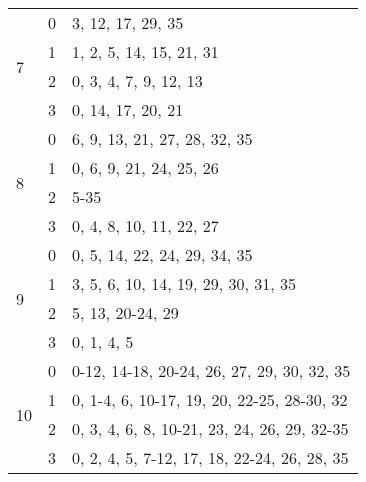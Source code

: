 \begin{table}[htb!]
\begin{tabular}{@{} lll @{}}
    \multirow{4}{*}{7} & 0 & 3, 12, 17, 29, 35\\
    & 1 & 1, 2, 5, 14, 15, 21, 31\\
    & 2 & 0, 3, 4, 7, 9, 12, 13\\
    & 3 & 0, 14, 17, 20, 21\\
    \multirow{4}{*}{8} & 0 & 6, 9, 13, 21, 27, 28, 32, 35\\
    & 1 & 0, 6, 9, 21, 24, 25, 26\\
    & 2 & 5-35\\
    & 3 & 0, 4, 8, 10, 11, 22, 27\\
    \multirow{4}{*}{9} & 0 & 0, 5, 14, 22, 24, 29, 34, 35\\
    & 1 & 3, 5, 6, 10, 14, 19, 29, 30, 31, 35\\
    & 2 & 5, 13, 20-24, 29\\
    & 3 & 0, 1, 4, 5\\
    \multirow{4}{*}{10} & 0 & 0-12, 14-18, 20-24, 26, 27, 29, 30, 32, 35\\
    & 1 & 0, 1-4, 6, 10-17, 19, 20, 22-25, 28-30, 32\\
    & 2 & 0, 3, 4, 6, 8, 10-21, 23, 24, 26, 29, 32-35\\
    & 3 & 0, 2, 4, 5, 7-12, 17, 18, 22-24, 26, 28, 35\\
    \bottomrule
  \end{tabular}
\end{table}

